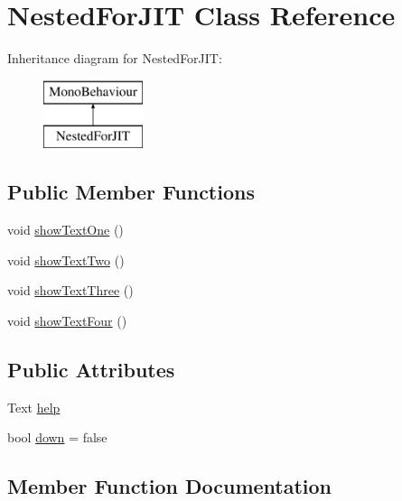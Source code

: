 \hypertarget{class_nested_for_j_i_t}{}\section{Nested\+For\+J\+IT Class Reference}
\label{class_nested_for_j_i_t}
Inheritance diagram for Nested\+For\+J\+IT\+:\begin{figure}[H]
\begin{center}
\leavevmode
\includegraphics[height=2.000000cm]{class_nested_for_j_i_t}
\end{center}
\end{figure}
\subsection*{Public Member Functions}
\begin{DoxyCompactItemize}
\item 
void \hyperlink{class_nested_for_j_i_t_a4d5794378db84bf4c5a8e47cb0fdf22e}{show\+Text\+One} ()
\item 
void \hyperlink{class_nested_for_j_i_t_a2947c4b7bdcc425be675bd988c283031}{show\+Text\+Two} ()
\item 
void \hyperlink{class_nested_for_j_i_t_aa2572d2149aef7acd4de9de1252e33f7}{show\+Text\+Three} ()
\item 
void \hyperlink{class_nested_for_j_i_t_ad9cf9f87e9f3664bf012e7f8306e3a4f}{show\+Text\+Four} ()
\end{DoxyCompactItemize}
\subsection*{Public Attributes}
\begin{DoxyCompactItemize}
\item 
Text \hyperlink{class_nested_for_j_i_t_ad3d5a4ec0034f914c533ba9da9614ce5}{help}
\item 
bool \hyperlink{class_nested_for_j_i_t_ad2b53657e8277ec61faf775924102a7e}{down} = false
\end{DoxyCompactItemize}


\subsection{Member Function Documentation}
\mbox{\label{class_nested_for_j_i_t_ad9cf9f87e9f3664bf012e7f8306e3a4f}} 
